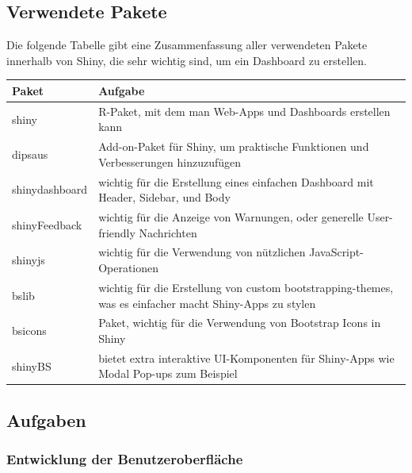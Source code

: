 \documentclass[12pt]{article}
\begin{document}
\subsection{Verwendete Pakete}
Die folgende Tabelle gibt eine Zusammenfassung aller verwendeten Pakete innerhalb von Shiny, die sehr wichtig sind, um ein Dashboard zu erstellen. 

\begin{table}[h]
\centering
	\begin{tabular}{|l|p{14cm}|}
        \hline
		Paket & Aufgabe \\ 
		\hline
		shiny & R-Paket, mit dem man Web-Apps und Dashboards erstellen kann \cite{shiny}\\
        \hline
        dipsaus & Add-on-Paket für Shiny, um praktische Funktionen und Verbesserungen hinzuzufügen \cite{dipsaus}\\
        \hline
        shinydashboard & wichtig für die Erstellung eines einfachen Dashboard mit Header, Sidebar, und Body \\
        \hline
        shinyFeedback & wichtig für die Anzeige von Warnungen, oder generelle User-friendly Nachrichten \\
        \hline
        shinyjs & wichtig für die Verwendung von nützlichen JavaScript-Operationen \cite{shinyjs}\\
        \hline
        bslib & wichtig für die Erstellung von custom bootstrapping-themes, was es einfacher macht Shiny-Apps zu stylen \cite{bslib}\\
        \hline
        bsicons & Paket, wichtig für die Verwendung von Bootstrap Icons in Shiny \cite{bsicons}\\
        \hline
        shinyBS & bietet extra interaktive UI-Komponenten für Shiny-Apps wie Modal Pop-ups zum Beispiel \cite{shinyBS} \\
        \hline

        
	\end{tabular}
\end{table}

\newpage
\subsection{Aufgaben}
\label{wichtigeAufgaben}

\subsubsection{Entwicklung der Benutzeroberfläche}
\end{document}
